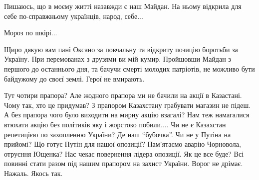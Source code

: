 \begin{itemize}

Пишаюсь, що в моєму житті назавжди є наш Майдан. На ньому відкрила для себе
по-справжньому українців, народ, себе...


Мороз по шкірі...


Щиро дякую вам пані Оксано за повчальну та відкриту позицію боротьби за
Україну. При перемованах з друзями ви мій кумир. Пройшовши Майдан з першого до
останнього дня, та бачучи смерті молодих патріотів, не можливо бути байдужому
до своєї землі. Герої не вмирають.


Тут чотири прапора? Але жодного прапора ми не бачили на акції в Казастані. Чому
так, хто це придумав? З прапором Казахстану грабувати магазин не підеш. А без
прапора чого було виходити на мирну акцію взагалі? Нам теж намагалися втюхати
акцію без політиків яку і жорстоко побили.... Чи не є Казахстан репетицією по
захопленню України? Де наш \enquote{бубочка}. Чи не у Путіна на прийомі? Що готує Путін
для нашої опозиції? Пам'ятаємо аварію Чорновола, отруєння Ющенка? Нас чекає
повернення лідера опозиції. Як це все буде? Всі повинні стати разом під нашим
прапором на захист України. Ворог не дрімає. Нажаль. Якось так.


\end{itemize} %
